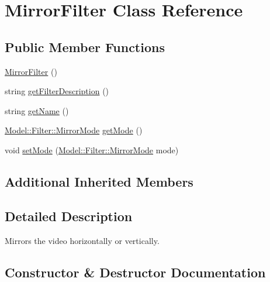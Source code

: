\hypertarget{classModel_1_1Filter_1_1MirrorFilter}{}\section{Mirror\+Filter Class Reference}
\label{classModel_1_1Filter_1_1MirrorFilter}
\subsection*{Public Member Functions}
\begin{DoxyCompactItemize}
\item 
\hyperlink{classModel_1_1Filter_1_1MirrorFilter_a534aebee3440f56936f691affb8be0d5}{Mirror\+Filter} ()
\item 
string \hyperlink{classModel_1_1Filter_1_1MirrorFilter_a62b7b60e24f92234393b840b35808e06}{get\+Filter\+Description} ()
\item 
string \hyperlink{classModel_1_1Filter_1_1MirrorFilter_a11335e13e50af74108bf926dc1340b4b}{get\+Name} ()
\item 
\hyperlink{namespaceModel_1_1Filter_a8a20195c97d8c704572b5922370c2fbc}{Model\+::\+Filter\+::\+Mirror\+Mode} \hyperlink{classModel_1_1Filter_1_1MirrorFilter_a49ba6d929bc296cb263b4c34b3f90f02}{get\+Mode} ()
\item 
void \hyperlink{classModel_1_1Filter_1_1MirrorFilter_a862e3564f078c1c424e88430eb1b283c}{set\+Mode} (\hyperlink{namespaceModel_1_1Filter_a8a20195c97d8c704572b5922370c2fbc}{Model\+::\+Filter\+::\+Mirror\+Mode} mode)
\end{DoxyCompactItemize}
\subsection*{Additional Inherited Members}


\subsection{Detailed Description}
Mirrors the video horizontally or vertically. 

\subsection{Constructor \& Destructor Documentation}
\hypertarget{classModel_1_1Filter_1_1MirrorFilter_a534aebee3440f56936f691affb8be0d5}{}
